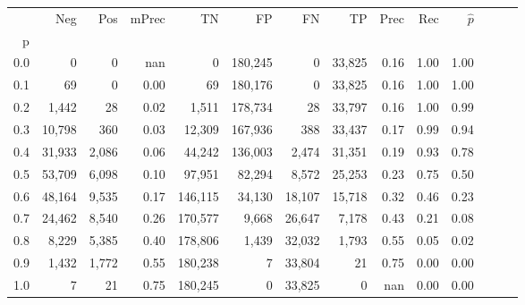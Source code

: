 \begin{tabular}{rrrrrrrrrrrrrr}
\toprule
{} &     Neg &    Pos & mPrec &       TN &       FP &      FN &      TP &  Prec &   Rec & $\hat{p}$ \\
p   &         &        &       &          &          &         &         &       &       &           \\
\midrule
0.0 &       0 &      0 &   nan &        0 &  180,245 &       0 &  33,825 &  0.16 &  1.00 &      1.00 \\
0.1 &      69 &      0 &  0.00 &       69 &  180,176 &       0 &  33,825 &  0.16 &  1.00 &      1.00 \\
0.2 &   1,442 &     28 &  0.02 &    1,511 &  178,734 &      28 &  33,797 &  0.16 &  1.00 &      0.99 \\
0.3 &  10,798 &    360 &  0.03 &   12,309 &  167,936 &     388 &  33,437 &  0.17 &  0.99 &      0.94 \\
0.4 &  31,933 &  2,086 &  0.06 &   44,242 &  136,003 &   2,474 &  31,351 &  0.19 &  0.93 &      0.78 \\
0.5 &  53,709 &  6,098 &  0.10 &   97,951 &   82,294 &   8,572 &  25,253 &  0.23 &  0.75 &      0.50 \\
0.6 &  48,164 &  9,535 &  0.17 &  146,115 &   34,130 &  18,107 &  15,718 &  0.32 &  0.46 &      0.23 \\
0.7 &  24,462 &  8,540 &  0.26 &  170,577 &    9,668 &  26,647 &   7,178 &  0.43 &  0.21 &      0.08 \\
0.8 &   8,229 &  5,385 &  0.40 &  178,806 &    1,439 &  32,032 &   1,793 &  0.55 &  0.05 &      0.02 \\
0.9 &   1,432 &  1,772 &  0.55 &  180,238 &        7 &  33,804 &      21 &  0.75 &  0.00 &      0.00 \\
1.0 &       7 &     21 &  0.75 &  180,245 &        0 &  33,825 &       0 &   nan &  0.00 &      0.00 \\
\bottomrule
\end{tabular}
